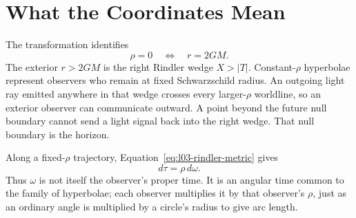\begin{classroomqa}
\end{classroomqa}

\section{What the Coordinates Mean}

The transformation identifies
\begin{equation}
\rho=0\quad\Longleftrightarrow\quad r=2GM.
\end{equation}
The exterior \(r>2GM\) is the right Rindler wedge \(X>|T|\). Constant-\(\rho\) hyperbolae represent observers who remain at fixed Schwarzschild radius. An outgoing light ray emitted anywhere in that wedge crosses every larger-\(\rho\) worldline, so an exterior observer can communicate outward. A point beyond the future null boundary cannot send a light signal back into the right wedge. That null boundary is the horizon.

\begin{classroomqa}
\end{classroomqa}

\begin{classroomqa}
\end{classroomqa}

Along a fixed-\(\rho\) trajectory, Equation~\eqref{eq:l03-rindler-metric} gives
\begin{equation}
d\tau=\rho\,d\omega.
\label{eq:l03-proper-time-rindler}
\end{equation}
Thus \(\omega\) is not itself the observer's proper time. It is an angular time common to the family of hyperbolae; each observer multiplies it by that observer's \(\rho\), just as an ordinary angle is multiplied by a circle's radius to give arc length.

